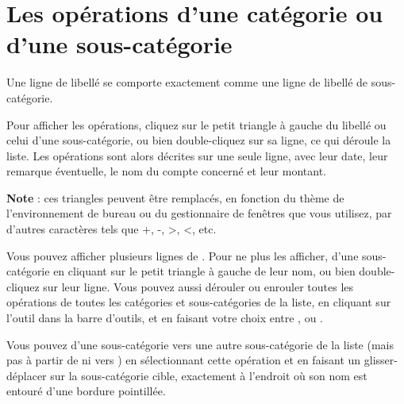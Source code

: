 \ifIllustration
\newpage
\fi


\section{Les opérations d'une catégorie ou d'une sous-catégorie\label{categories-transactions}}


Une ligne de libellé  se comporte exactement comme une ligne de libellé de sous-catégorie.

Pour afficher les opérations, cliquez sur le petit triangle à gauche du libellé   ou celui d'une sous-catégorie, ou bien double-cliquez sur sa ligne,
 ce qui déroule la liste. Les opérations sont alors décrites sur une seule ligne, avec leur date, leur remarque éventuelle, le nom du compte concerné et leur montant.

\textbf{Note} : ces triangles peuvent être remplacés, en fonction du thème de l'environnement de bureau ou du gestionnaire de fenêtres que vous utilisez, par d'autres caractères tels que +, -, >, <, etc. 

 
Vous pouvez afficher plusieurs lignes de . Pour ne plus les afficher,  d'une sous-catégorie en cliquant sur le petit triangle à gauche de leur nom, ou bien double-cliquez sur leur ligne. Vous pouvez aussi dérouler ou enrouler toutes les opérations de toutes les catégories et sous-catégories de la liste, en cliquant sur l'outil  dans la barre d'outils, et en faisant votre choix entre ,  ou .

Vous pouvez  d'une sous-catégorie vers une autre sous-catégorie de la liste (mais pas à partir de  ni vers ) en sélectionnant cette opération et en faisant un glisser-déplacer sur la sous-catégorie cible, exactement à l'endroit où son nom est entouré d'une bordure pointillée.

